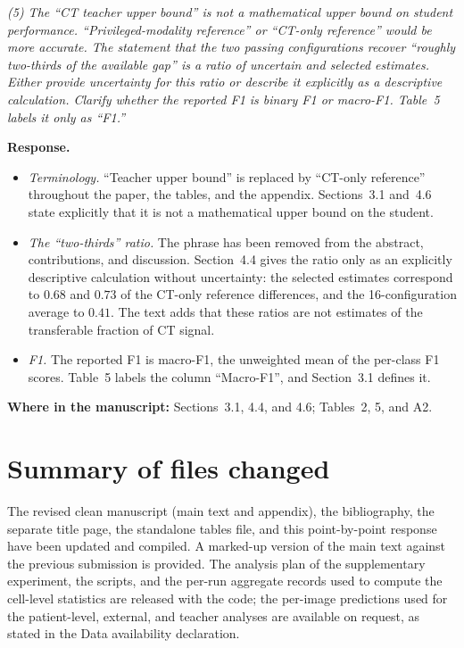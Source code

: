 \documentclass[11pt]{article}
\newenvironment{rcomment}{\par\noindent\begin{minipage}{\linewidth}\itshape\color{black!75}}{\end{minipage}\par}
\newcommand{\where}[1]{\par\noindent\textbf{Where in the manuscript:} #1\par}
\begin{document}
\begin{rcomment}
(5) The ``CT teacher upper bound'' is not a mathematical upper bound on student performance. ``Privileged-modality reference'' or ``CT-only reference'' would be more accurate. The statement that the two passing configurations recover ``roughly two-thirds of the available gap'' is a ratio of uncertain and selected estimates. Either provide uncertainty for this ratio or describe it explicitly as a descriptive calculation. Clarify whether the reported F1 is binary F1 or macro-F1. Table~5 labels it only as ``F1.''
\end{rcomment}

\textbf{Response.}
\begin{itemize}[leftmargin=1.4em]
  \item \emph{Terminology.} ``Teacher upper bound'' is replaced by ``CT-only reference'' throughout the paper, the tables, and the appendix. Sections~3.1 and~4.6 state explicitly that it is not a mathematical upper bound on the student.
  \item \emph{The ``two-thirds'' ratio.} The phrase has been removed from the abstract, contributions, and discussion. Section~4.4 gives the ratio only as an explicitly descriptive calculation without uncertainty: the selected estimates correspond to $0.68$ and $0.73$ of the CT-only reference differences, and the 16-configuration average to $0.41$. The text adds that these ratios are not estimates of the transferable fraction of CT signal.
  \item \emph{F1.} The reported F1 is macro-F1, the unweighted mean of the per-class F1 scores. Table~5 labels the column ``Macro-F1'', and Section~3.1 defines it.
\end{itemize}
\where{Sections~3.1, 4.4, and 4.6; Tables~2, 5, and A2.}

\hrulefill

\section*{Summary of files changed}

The revised clean manuscript (main text and appendix), the bibliography, the
separate title page, the standalone tables file, and this point-by-point
response have been updated and compiled. A marked-up version of the main text
against the previous submission is provided. The analysis plan of the
supplementary experiment, the scripts, and the per-run aggregate records used
to compute the cell-level statistics are released with the code; the per-image
predictions used for the patient-level, external, and teacher analyses are
available on request, as stated in the Data availability declaration.
\end{document}
